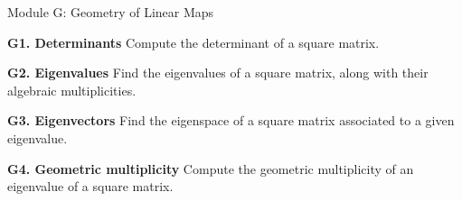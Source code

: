 
\begin{module}{Module G: Geometry of Linear Maps}

\begin{moduleStandards}
  \item \textbf{G1. Determinants}
        Compute the determinant of a square matrix.
  \item \textbf{G2. Eigenvalues}
        Find the eigenvalues of a square matrix, along with their algebraic multiplicities.
  \item \textbf{G3. Eigenvectors}
        Find the eigenspace of a square matrix associated to a given eigenvalue.
   \item \textbf{G4. Geometric multiplicity}
        Compute the geometric multiplicity of an eigenvalue of a square matrix.
\end{moduleStandards}





\end{module}